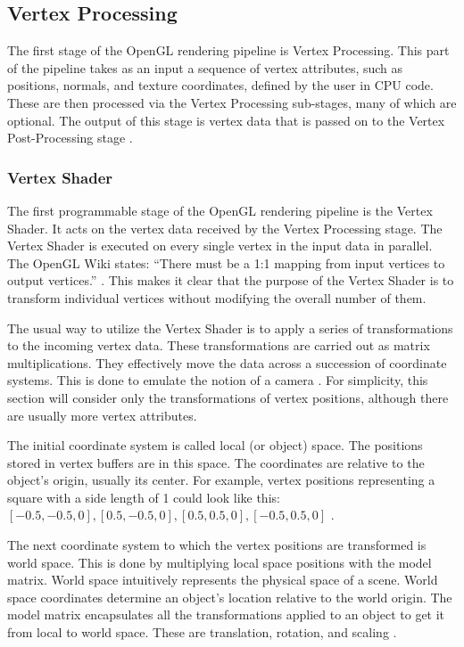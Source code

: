 \documentclass[
  digital,     %
  oneside,     %
  nosansbold,  %
  nocolorbold, %
  lof,         %
  lot,         %
]{fithesis4}
\begin{document}
\subsection{Vertex Processing}
The first stage of the OpenGL rendering pipeline is Vertex Processing. This part of the pipeline takes
as an input a sequence of vertex attributes, such as positions, normals, and texture coordinates,
defined by the user in CPU code. These are then processed via the Vertex Processing sub-stages,
many of which are optional. The output of this stage is vertex data that is passed
on to the Vertex Post-Processing stage \cite{openglwiki-vertex-processing}.

\subsubsection{Vertex Shader}
The first programmable stage of the OpenGL rendering pipeline is the Vertex Shader. It acts on
the vertex data received by the Vertex Processing stage. The Vertex Shader is executed on every
single vertex in the input data in parallel. The OpenGL Wiki states: \enquote{There must be a 1:1 mapping from
input vertices to output vertices.} \cite{openglwiki-vertex-shader}.
This makes it clear that the purpose of the Vertex Shader is to
transform individual vertices without modifying the overall number of them.

The usual way to utilize the Vertex Shader is to apply a series of transformations to the incoming vertex data.
These transformations are carried out as matrix multiplications.
They effectively move the data across a succession of coordinate systems. This is done to emulate the notion of a camera
\cite[p.125-126]{opengl-book}. For simplicity, this section will consider only the transformations of vertex positions,
although there are usually more vertex attributes.

The initial coordinate system is called local (or object) space.
The positions stored in vertex buffers are in this space.
The coordinates are relative to the object's origin, usually its center. For example, vertex positions
representing a square with a side length of 1 could look like this: $[-0.5,-0.5,0], [0.5,-0.5,0], [0.5,0.5,0], [-0.5,0.5,0]$
\cite{learnopengl-coord-systems}.

The next coordinate system to which the vertex positions are transformed is world space.
This is done by multiplying local space positions with the model matrix.
World space intuitively represents the physical space of a scene. World space coordinates
determine an object's location relative to the world origin.
The model matrix encapsulates all the transformations applied to an object to get it from local
to world space. These are translation, rotation, and scaling \cite{learnopengl-coord-systems}.
\end{document}
